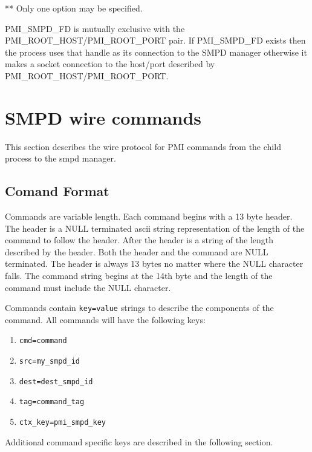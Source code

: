 \documentclass[dvipdfm,11pt]{article}
\begin{document}
** Only one option may be specified.

PMI\_SMPD\_FD is mutually exclusive with the 
PMI\_ROOT\_HOST/PMI\_ROOT\_PORT pair.  If PMI\_SMPD\_FD exists then 
the process uses that handle as its connection to the SMPD manager 
otherwise it makes a socket connection to the
host/port described by PMI\_ROOT\_HOST/PMI\_ROOT\_PORT.

\section{SMPD wire commands}
This section describes the wire protocol for PMI commands from the child
process to the smpd manager.

\subsection{Comand Format}
Commands are variable length.
Each command begins with a 13 byte header.  The header 
is a NULL terminated ascii string representation of the length of the 
command to follow the header.  After the header is a string of the length 
described by the header.  Both the header and the command are NULL terminated.
The header is always 13 bytes no matter where the NULL character falls.  The
command string begins at the 14th byte and the length of the command must 
include the NULL character.

Commands contain \texttt{key=value} strings to describe the components of 
the command.  All commands will have the following keys:

\begin{enumerate}
\item \texttt{cmd=command}
\item \texttt{src=my\_smpd\_id}
\item \texttt{dest=dest\_smpd\_id}
\item \texttt{tag=command\_tag}
\item \texttt{ctx\_key=pmi\_smpd\_key}
\end{enumerate}

Additional command specific keys are described in the following section.
\end{document}
